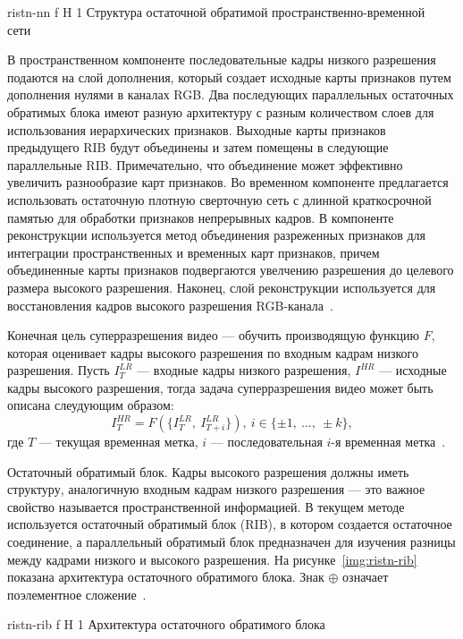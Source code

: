 \documentclass{bmstu}
\begin{document}
    {ristn-nn}
    {f}
    {H}
    {1\textwidth}
    {Структура остаточной обратимой пространственно-временной сети~\cite{Xiaobin2019}}
    
В пространственном компоненте последовательные кадры низкого разрешения подаются на слой дополнения, который создает исходные карты признаков путем дополнения нулями в каналах RGB. 
Два последующих параллельных остаточных обратимых блока имеют разную архитектуру с разным количеством слоев для использования иерархических признаков. 
Выходные карты признаков предыдущего RIB будут объединены и затем помещены в следующие параллельные RIB. 
Примечательно, что объединение может эффективно увеличить разнообразие карт признаков. 
Во временном компоненте предлагается использовать остаточную плотную сверточную сеть с длинной краткосрочной памятью для обработки признаков непрерывных кадров. 
В компоненте реконструкции используется метод объединения разреженных признаков для интеграции пространственных и временных карт признаков, причем объединенные карты признаков подвергаются увелчению разрешения до целевого размера высокого разрешения. 
Наконец, слой реконструкции используется для восстановления кадров высокого разрешения RGB-канала~\cite{Xiaobin2019}.

Конечная цель суперразрешения видео --- обучить производящую функцию $F$, которая оценивает кадры высокого разрешения по входным кадрам низкого разрешения. 
Пусть $I^{LR}_T$ --- входные кадры низкого разрешения, $I^{HR}$ --- исходные кадры высокого разрешения, тогда задача суперразрешения видео может быть описана слеудующим образом:
\begin{equation}
I^{HR}_T = F(\{I^{LR}_T,~I^{LR}_{T + i}\}),~i \in \{\pm 1,~...,~\pm k\},
\end{equation}
где $T$ --- текущая временная метка, $i$ --- последовательная $i$-я временная метка~\cite{Xiaobin2019}.

Остаточный обратимый блок. 
Кадры высокого разрешения должны иметь структуру, аналогичную входным кадрам низкого разрешения --- это важное свойство называется пространственной информацией. 
В текущем методе используется остаточный обратимый блок (RIB), в котором создается остаточное соединение, а параллельный обратимый блок предназначен для изучения разницы между кадрами низкого и высокого разрешения. 
На рисунке~\ref{img:ristn-rib} показана архитектура остаточного обратимого блока. 
Знак $\oplus$ означает поэлементное сложение~\cite{Xiaobin2019}.

    {ristn-rib}
    {f}
    {H}
    {1\textwidth}
    {Архитектура остаточного обратимого блока~\cite{Xiaobin2019}}
    
\end{document}
